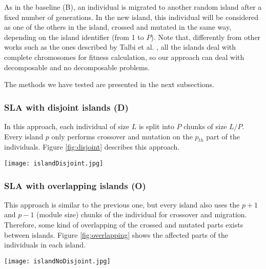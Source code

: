 \documentclass[preprint]{elsarticle}
\begin{document}
As in the baseline (B), an individual is migrated to another random
island after a fixed number of generations. In the new island, this
individual will be considered as one of the others in the island,
crossed and mutated in the same way, depending on the island
identifier (from 1 to $P$). Note that, differently from other works such as the ones
described by Talbi et al. \citep{Talbi08Parallel}, all the islands deal
with complete chromosomes for fitness calculation, so our approach can
deal with decomposable and no decomposable problems. %

The methods we have tested are presented in the next subsections. 

\subsubsection{SLA with disjoint islands (D)} 
In this approach, each individual of size $L$ is split into $P$ chunks
of size $L/P$. Every island $p$ only performs crossover and mutation
on the $p_{th}$ part of the individuals. Figure \ref{fig:disjoint}
describes this approach.
%
\begin{figure*}[h!tb]
\centering
\texttt{[image: islandDisjoint.jpg]}
\caption{SLA with disjoint islands (D): every island $p$ only modifies the $p_{th}$ components (in grey) of the individuals.}
\label{fig:disjoint}
\end{figure*}

\subsubsection{SLA with overlapping islands (O)}
This approach is similar to the previous one, but every island also uses the $p+1$ and $p-1$ (module size) chunks of the individual for crossover and migration. Therefore, some kind of overlapping of the crossed and mutated parts exists between islands. Figure \ref{fig:overlapping} shows the affected parts of the individuals in
each island. 

\begin{figure*}[h!tb]
\centering
\texttt{[image: islandNoDisjoint.jpg]}
\caption{SLA with overlapping islands (O): every island $p$ modifies the  $p+1$,
  $p_{th}$ and $p-1$  components (in grey) of the individuals.}
  \label{fig:overlapping}
\end{figure*}
\end{document}
